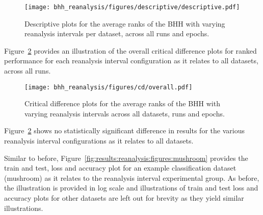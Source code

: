 \begin{figure}[htbp]
	\centering
	\texttt{[image: bhh\_reanalysis/figures/descriptive/descriptive.pdf]}
	\caption{Descriptive plots for the average ranks of the \acs{BHH} with varying reanalysis intervals per dataset, across all runs and epochs.}
	\label{fig:results:reanalysis:descriptive:descriptive}
\end{figure}

Figure~\ref{fig:results:reanalysis:descriptive:cd} provides an illustration of the overall critical difference plots for ranked performance for each reanalysis interval configuration as it relates to all datasets, across all runs.

\begin{figure}[htbp]
	\centering
	\texttt{[image: bhh\_reanalysis/figures/cd/overall.pdf]}
	\caption{Critical difference plots for the average ranks of the \acs{BHH} with varying reanalysis intervals across all datasets, runs and epochs.}
	\label{fig:results:reanalysis:descriptive:cd}
\end{figure}

Figure~\ref{fig:results:reanalysis:descriptive:cd} shows no statistically significant difference in results for the various reanalysis interval configurations as it relates to all datasets.

Similar to before, Figure~\ref{fig:results:reanalysis:figures:mushroom} provides the train and test, loss and accuracy plot for an example classification dataset (mushroom) as it relates to the reanalysis interval experimental group. As before, the illustration is provided in log scale and illustrations of train and test loss and accuracy plots for other datasets are left out for brevity as they yield similar illustrations.

